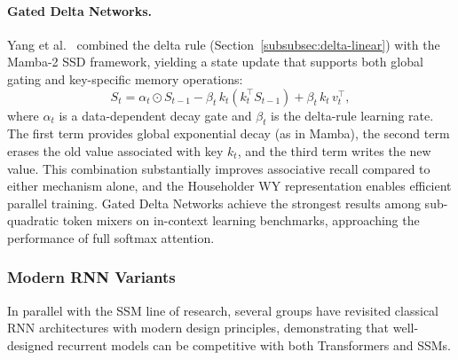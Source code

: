 \paragraph{Gated Delta Networks.}
Yang et al.~\cite{yang2024gated} combined the delta rule (Section~\ref{subsubsec:delta-linear}) with the Mamba-2 SSD framework, yielding a state update that supports both global gating and key-specific memory operations:
\begin{equation}
S_t = \alpha_t \odot S_{t-1} - \beta_t\, k_t (k_t^\top S_{t-1}) + \beta_t\, k_t\, v_t^\top,
\label{eq:gated-delta-ssm}
\end{equation}
where $\alpha_t$ is a data-dependent decay gate and $\beta_t$ is the delta-rule learning rate. The first term provides global exponential decay (as in Mamba), the second term erases the old value associated with key $k_t$, and the third term writes the new value. This combination substantially improves associative recall compared to either mechanism alone, and the Householder WY representation enables efficient parallel training. Gated Delta Networks achieve the strongest results among sub-quadratic token mixers on in-context learning benchmarks, approaching the performance of full softmax attention.

\subsubsection{Modern RNN Variants}
\label{subsubsec:modern-rnn}

In parallel with the SSM line of research, several groups have revisited classical RNN architectures with modern design principles, demonstrating that well-designed recurrent models can be competitive with both Transformers and SSMs.


